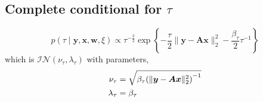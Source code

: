 \documentclass{article}
\numberwithin{equation}{section}
\newcommand{\lh}{\mathopen{}\mathclose\bgroup\left}
\newcommand{\rh}{\aftergroup\egroup\right}
\newcommand{\m}[1]{\boldsymbol{#1}}
\begin{document}
\subsection{Complete conditional for $\tau$}
\begin{equation}
p(\tau \mid \m{y}, \m{x}, \m{w}, \xi) \propto
 \tau^{-\frac{3}{2}}
 \exp\left\{
  -\frac{\tau}{2} \| \m{y} - \m{A} \m{x} \|_2^2
  -\frac{\beta_\tau}{2} \tau^{-1}
 \right\}
\end{equation}
which is $\mathcal{IN}(\nu_\tau, \lambda_\tau)$ with parameters,
\begin{equation}
\begin{aligned}
\nu_\tau &= \sqrt{\beta_\tau \lh( \| \m{y} - \m{A} \m{x} \|_2^2 \rh)^{-1}}
\\
\lambda_\tau &= \beta_\tau
\end{aligned}
\end{equation}

\end{document}
